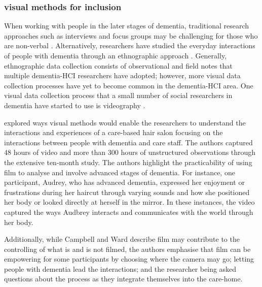 

\subsubsection{visual methods for inclusion}
When working with people in the later stages of dementia, traditional research approaches such as interviews and focus groups may be challenging for those who are non-verbal \citep{swarbrick2015quest}. Alternatively, researchers have studied the everyday interactions of people with dementia through an ethnographic approach \citep{kontos_ethnographic_2004,morrissey_value_2017,foley_care_2019}. Generally, ethnographic data collection consists of observational and field notes that multiple dementia-HCI researchers have adopted; however, more visual data collection processes have yet to become common in the dementia-HCI area. One visual data collection process that a small number of social researchers in dementia have started to use is videography \citep{phillipson2018more}.

\cite{campbell2017video} explored ways visual methods would enable the researchers to understand the interactions and experiences of a care-based hair salon focusing on the interactions between people with dementia and care staff. The authors captured 48 hours of video and more than 300 hours of unstructured observations through the extensive ten-month study. The authors highlight the practicability of using film to analyse and involve advanced stages of dementia. For instance, one participant, Audrey, who has advanced dementia, expressed her enjoyment or frustrations during her haircut through varying sounds and how she positioned her body or looked directly at herself in the mirror. In these instances, the video captured the ways Audbrey interacts and communicates with the world through her body. 

Additionally, while Campbell and Ward describe film may contribute to the controlling of what is and is not filmed, the authors emphasise that film can be empowering for some participants by choosing where the camera may go; letting people with dementia lead the interactions; and the researcher being asked questions about the process as they integrate themselves into the care-home. 


